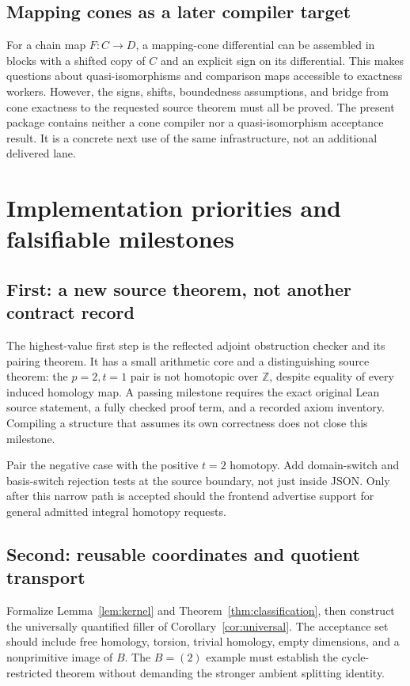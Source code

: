 \documentclass[11pt,letterpaper]{article}
\theoremstyle{definition}\newtheorem{definition}[theorem]{Definition}
\theoremstyle{remark}\newtheorem{remark}[theorem]{Remark}
\newcommand{\Z}{\mathbb Z}\newcommand{\Q}{\mathbb Q}
\begin{document}
\subsection{Mapping cones as a later compiler target}
For a chain map $F:C\to D$, a mapping-cone differential can be assembled in
blocks with a shifted copy of $C$ and an explicit sign on its differential.
This makes questions about quasi-isomorphisms and comparison maps accessible to
exactness workers. However, the signs, shifts, boundedness assumptions, and
bridge from cone exactness to the requested source theorem must all be proved.
The present package contains neither a cone compiler nor a quasi-isomorphism
acceptance result. It is a concrete next use of the same infrastructure, not an
additional delivered lane.

\section{Implementation priorities and falsifiable milestones}
\label{sec:roadmap}

\subsection{First: a new source theorem, not another contract record}
The highest-value first step is the reflected adjoint obstruction checker and
its pairing theorem. It has a small arithmetic core and a distinguishing
source theorem: the $p=2,t=1$ pair is not homotopic over $\Z$, despite equality
of every induced homology map. A passing milestone requires the exact original
Lean source statement, a fully checked proof term, and a recorded axiom
inventory. Compiling a structure that assumes its own correctness does not
close this milestone.

Pair the negative case with the positive $t=2$ homotopy. Add domain-switch and
basis-switch rejection tests at the source boundary, not just inside JSON.
Only after this narrow path is accepted should the frontend advertise support
for general admitted integral homotopy requests.

\subsection{Second: reusable coordinates and quotient transport}
Formalize Lemma~\ref{lem:kernel} and Theorem~\ref{thm:classification}, then
construct the universally quantified filler of
Corollary~\ref{cor:universal}. The acceptance set should include free homology,
torsion, trivial homology, empty dimensions, and a nonprimitive image of $B$.
The $B=(2)$ example must establish the cycle-restricted theorem without demanding
the stronger ambient splitting identity.
\end{document}
